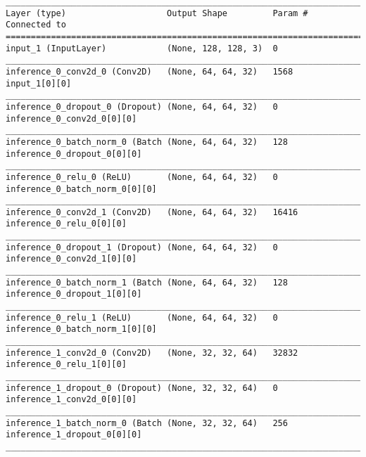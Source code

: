 \begin{lstlisting}[caption={CelebA-\ac{VLAE} Encoder},captionpos=b,basicstyle=\tiny, label={lst:celeba-vlae-encoder}]
__________________________________________________________________________________________________
Layer (type)                    Output Shape         Param #     Connected to
==================================================================================================
input_1 (InputLayer)            (None, 128, 128, 3)  0
__________________________________________________________________________________________________
inference_0_conv2d_0 (Conv2D)   (None, 64, 64, 32)   1568        input_1[0][0]
__________________________________________________________________________________________________
inference_0_dropout_0 (Dropout) (None, 64, 64, 32)   0           inference_0_conv2d_0[0][0]
__________________________________________________________________________________________________
inference_0_batch_norm_0 (Batch (None, 64, 64, 32)   128         inference_0_dropout_0[0][0]
__________________________________________________________________________________________________
inference_0_relu_0 (ReLU)       (None, 64, 64, 32)   0           inference_0_batch_norm_0[0][0]
__________________________________________________________________________________________________
inference_0_conv2d_1 (Conv2D)   (None, 64, 64, 32)   16416       inference_0_relu_0[0][0]
__________________________________________________________________________________________________
inference_0_dropout_1 (Dropout) (None, 64, 64, 32)   0           inference_0_conv2d_1[0][0]
__________________________________________________________________________________________________
inference_0_batch_norm_1 (Batch (None, 64, 64, 32)   128         inference_0_dropout_1[0][0]
__________________________________________________________________________________________________
inference_0_relu_1 (ReLU)       (None, 64, 64, 32)   0           inference_0_batch_norm_1[0][0]
__________________________________________________________________________________________________
inference_1_conv2d_0 (Conv2D)   (None, 32, 32, 64)   32832       inference_0_relu_1[0][0]
__________________________________________________________________________________________________
inference_1_dropout_0 (Dropout) (None, 32, 32, 64)   0           inference_1_conv2d_0[0][0]
__________________________________________________________________________________________________
inference_1_batch_norm_0 (Batch (None, 32, 32, 64)   256         inference_1_dropout_0[0][0]
__________________________________________________________________________________________________

\end{lstlisting}
